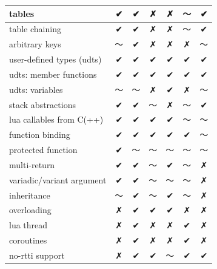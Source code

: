 \documentclass[conference,compsoc]{IEEEtran}
\begin{document}
\begin{table}[ht!]
\begin{tabular}{l c c c c c c }
		\\ \hline
		tables                    &        ✔       &     ✔    &     ✗    &     ✗     &        〜        &    ✔
		\\ \hline
		table chaining            &        ✔       &     ✔    &     ✗    &     ✗     &        〜        &    ✔
		\\ \hline
		arbitrary keys            &        〜       &     ✔    &     ✗    &     ✗     &        ✗        &    〜
		\\ \hline
		user-defined types (udts) &        ✔       &     ✔    &     ✔    &     ✔     &        ✔        &    ✔
		\\ \hline
		udts: member functions    &        ✔       &     ✔    &     ✔    &     ✔     &        ✔        &    ✔
		\\ \hline
		udts: variables           &        〜       &     〜    &     ✗    &     ✔     &        ✗        &    〜
		\\ \hline
		stack abstractions        &        ✔       &     ✔    &     〜    &     ✗     &        〜        &    ✔
		\\ \hline
		lua callables from C(++)  &        ✔       &     ✔    &     ✔    &     ✔     &        〜        &    〜
		\\ \hline
		function binding          &        ✔       &     ✔    &     ✔    &     ✔     &        ✔        &    〜
		\\ \hline
		protected function        &        ✔       &     〜    &     〜    &     〜     &        〜        &    〜
		\\ \hline
		multi-return              &        ✔       &     ✔    &     〜    &     ✔     &        〜        &    ✗
		\\ \hline
		variadic/variant argument &        ✔       &     ✔    &     〜    &     〜     &        〜        &    ✗
		\\ \hline
		inheritance               &        〜       &     ✔    &     〜    &     ✔     &        〜        &    ✗
		\\ \hline
		overloading               &        ✗       &     ✔    &     ✔    &     ✔     &        ✗        &    ✗
		\\ \hline
		lua thread                &        ✗       &     ✔    &     ✗    &     ✗     &        ✔        &    ✗
		\\ \hline
		coroutines                &        ✗       &     ✔    &     ✗    &     ✗     &        ✔        &    ✗
		\\ \hline
		no-rtti support           &        ✗       &     ✔    &     ✔    &     〜     &        ✔        &    ✔

\end{tabular}
\end{table}
\end{document}
